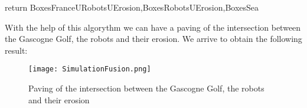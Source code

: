 \begin{algorithm}
\begin{algorithmic}
  		\ENDIF
  		 \vspace{0.3 cm}
 	 \ENDWHILE 
	
	\vspace{0.3 cm}
	
  return BoxesFranceURobotsUErosion,BoxesRobotsUErosion,BoxesSea


  \end{algorithmic}
\end{algorithm}

\vfill

\clearpage



\newpage

	With the help of this algorythm we can have a paving of the intersection between the Gascogne Golf, the robots and their erosion. We arrive to obtain the following result:
	

	
	\begin{figure}[!h] 
    \center
    	\texttt{[image: SimulationFusion.png]} 
    	\caption{Paving of the intersection between the Gascogne Golf, the robots and their erosion } 
    \label{S1 U S2}
	\end{figure} 
